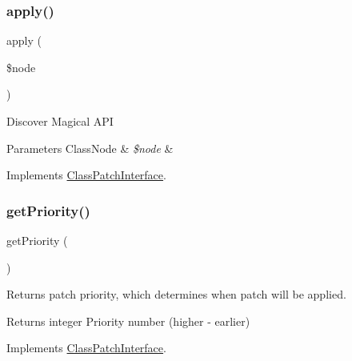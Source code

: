 \subsubsection{\texorpdfstring{apply()}{apply()}}
{\footnotesize\ttfamily apply (\begin{DoxyParamCaption}\item[{\mbox{\hyperlink{class_prophecy_1_1_doubler_1_1_generator_1_1_node_1_1_class_node}{Class\+Node}}}]{\$node }\end{DoxyParamCaption})}

Discover Magical A\+PI


\begin{DoxyParams}[1]{Parameters}
Class\+Node & {\em \$node} & \\
\hline
\end{DoxyParams}


Implements \mbox{\hyperlink{interface_prophecy_1_1_doubler_1_1_class_patch_1_1_class_patch_interface_a62fdb697928f35fc782d6889b8fe9b8b}{Class\+Patch\+Interface}}.

\mbox{\label{class_prophecy_1_1_doubler_1_1_class_patch_1_1_magic_call_patch_a1e7a3c168dcd0901a0d2669c67575b55}} 
\subsubsection{\texorpdfstring{get\+Priority()}{getPriority()}}
{\footnotesize\ttfamily get\+Priority (\begin{DoxyParamCaption}{ }\end{DoxyParamCaption})}

Returns patch priority, which determines when patch will be applied.

\begin{DoxyReturn}{Returns}
integer Priority number (higher -\/ earlier) 
\end{DoxyReturn}


Implements \mbox{\hyperlink{interface_prophecy_1_1_doubler_1_1_class_patch_1_1_class_patch_interface_a1e7a3c168dcd0901a0d2669c67575b55}{Class\+Patch\+Interface}}.

